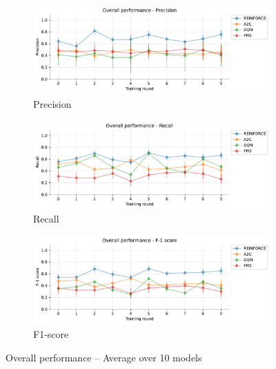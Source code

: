 \documentclass[a4paper, 12pt]{article}
\begin{document}
\begin{appendices}
\begin{figure}[h]
	\begin{subfigure}{\textwidth}
		\centering
		\includegraphics[width=\linewidth]{Overall_Pr.pdf}  
		\caption{Precision}
		\label{fig:tr-ovr-pr}
	\end{subfigure} \par\smallskip
	
	\begin{subfigure}{\textwidth}
		\centering
		\includegraphics[width=\linewidth]{Overall_Rc.pdf}  
		\caption{Recall}
		\label{fig:tr-ovr-rc}
	\end{subfigure} \par\smallskip
	
	\begin{subfigure}{\textwidth}
		\centering
		\includegraphics[width=\linewidth]{Overall_F1.pdf}  
		\caption{F1-score}
		\label{fig:tr-ovr-f1}
	\end{subfigure}
	\caption{Overall performance -- Average over 10 models}
	\label{fig:tr-overall}
\end{figure}


\end{appendices}
\end{document}
